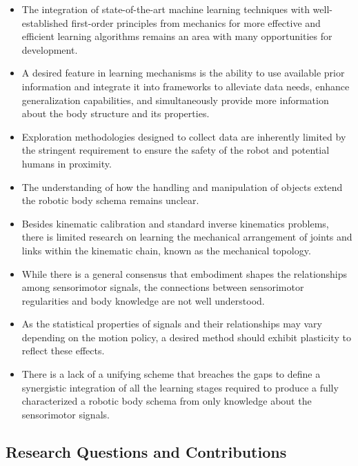 \documentclass[12pt, a4paper]{article}
\begin{document}
\begin{itemize}
\item The integration of state-of-the-art machine learning techniques with well-established first-order principles from mechanics for more effective and efficient learning algorithms remains an area with many opportunities for development.

\item A desired feature in learning mechanisms is the ability to use available prior information and integrate it into frameworks to alleviate data needs, enhance generalization capabilities, and simultaneously provide more information about the body structure and its properties.

\item Exploration methodologies designed to collect data are inherently limited by the stringent requirement to ensure the safety of the robot and potential humans in proximity.

\item The understanding of how the handling and manipulation of objects extend the robotic body schema remains unclear.

\item Besides kinematic calibration and standard inverse kinematics problems, there is limited research on learning the mechanical arrangement of joints and links within the kinematic chain, known as the mechanical topology.

\item While there is a general consensus that embodiment shapes the relationships among sensorimotor signals, the connections between sensorimotor regularities and body knowledge are not well understood.

\item As the statistical properties of signals and their relationships may vary depending on the motion policy, a desired method should exhibit plasticity to reflect these effects.

\item There is a lack of a unifying scheme that breaches the gaps to define a synergistic integration of all the learning stages required to produce a fully characterized a robotic body schema from only knowledge about the sensorimotor signals.
	
\end{itemize}

\subsection*{Research Questions and Contributions}
\end{document}
